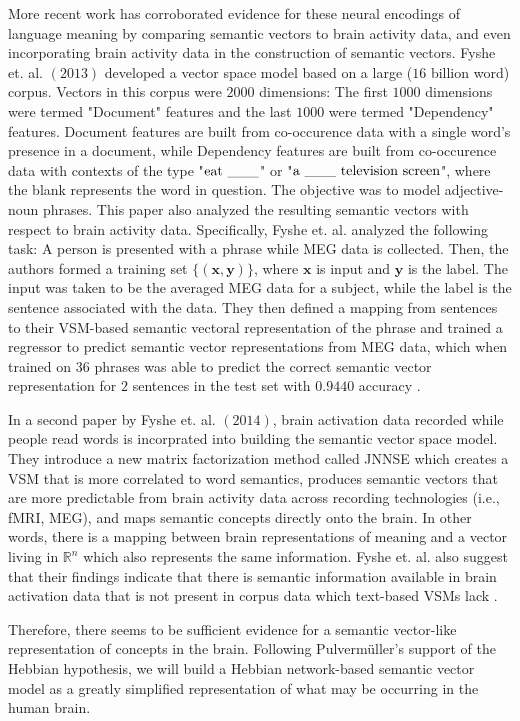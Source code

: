 \documentclass[12pt, usenames]{article}
\theoremstyle{definition}
\theoremstyle{definition}
\theoremstyle{definition}
\newcommand{\txt}[1]
{\textnormal{#1}}
\newcommand{\vv}[1]
{\textbf{#1}}
\begin{document}
More recent work has corroborated evidence for these neural encodings of language meaning by comparing semantic vectors to brain activity data, and even incorporating brain activity data in the construction of semantic vectors. Fyshe et. al. $(2013)$ developed a vector space model based on a large ($16$ billion word) corpus. Vectors in this corpus were $2000$ dimensions: The first $1000$ dimensions were termed "Document" features and the last $1000$ were termed "Dependency" features. Document features are built from co-occurence data with a single word's presence in a document, while Dependency features are built from co-occurence data with contexts of the type "$\txt{eat \_\_\_}$" or "$\txt{a \_\_\_ television screen}$", where the blank represents the word in question. The objective was to model adjective-noun phrases. This paper also analyzed the resulting semantic vectors with respect to brain activity data. Specifically, Fyshe et. al. analyzed the following task: A person is presented with a phrase while MEG data is collected. Then, the authors formed a training set $\{(\vv{x}, \vv{y})\}$, where $\vv{x}$ is input and $\vv{y}$ is the label. The input was taken to be the averaged MEG data for a subject, while the label is the sentence associated with the data. They then defined a mapping from sentences to their VSM-based semantic vectoral representation of the phrase and trained a regressor to predict semantic vector representations from MEG data, which when trained on $36$ phrases was able to predict the correct semantic vector representation for $2$ sentences in the test set with $0.9440$ accuracy \cite{Fyshe2013}. 

In a second paper by Fyshe et. al. $(2014)$, brain activation data recorded while people read words is incorprated into building the semantic vector space model. They introduce a new matrix factorization method called JNNSE which creates a VSM that is more correlated to word semantics, produces semantic vectors that are more predictable from brain activity data across recording technologies (i.e., fMRI, MEG), and maps semantic concepts directly onto the brain. In other words, there is a mapping between brain representations of meaning and a vector living in $\mathbb{R}^n$ which also represents the same information. Fyshe et. al. also suggest that their findings indicate that there is semantic information available in brain activation data that is not present in corpus data which text-based VSMs lack \cite{Fyshe2014}. 

Therefore, there seems to be sufficient evidence for a semantic vector-like representation of concepts in the brain. Following Pulverm{\"u}ller's support of the Hebbian hypothesis, we will build a Hebbian network-based semantic vector model as a greatly simplified representation of what may be occurring in the human brain.
\end{document}
